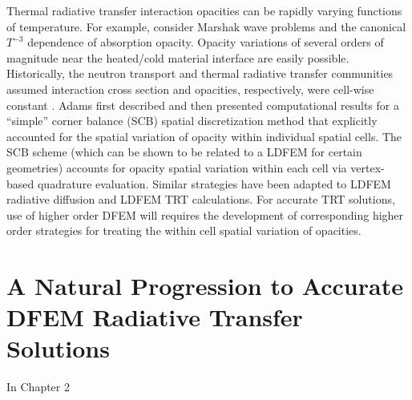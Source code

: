 Thermal radiative transfer interaction opacities can be rapidly varying functions of temperature.  
For example, consider Marshak wave problems and the canonical $T^{-3}$ dependence \cite{ober_shadid} of absorption opacity.
Opacity variations of several orders of magnitude near the heated/cold material interface are easily possible.
Historically, the neutron transport and thermal radiative transfer communities assumed interaction cross section and opacities, respectively, were cell-wise constant \cite{adams,lewis_book,morel_radtran}.
Adams first described \cite{adams_scb} and then presented computational results \cite{adams_nowak} for a ``simple'' corner balance (SCB) spatial discretization method that explicitly accounted for the spatial variation of opacity within individual spatial cells.
The SCB scheme (which can be shown to be related to a LDFEM for certain geometries) accounts for opacity spatial variation within each cell via vertex-based quadrature evaluation.  
Similar strategies have been adapted to LDFEM radiative diffusion \cite{ober_shadid} and LDFEM TRT \cite{warsa_lmfga} calculations.
For accurate TRT solutions, use of higher order DFEM will requires the development of corresponding higher order strategies  for treating the within cell spatial variation of opacities.

\section{A Natural Progression to Accurate DFEM Radiative Transfer Solutions}

In  Chapter 2
